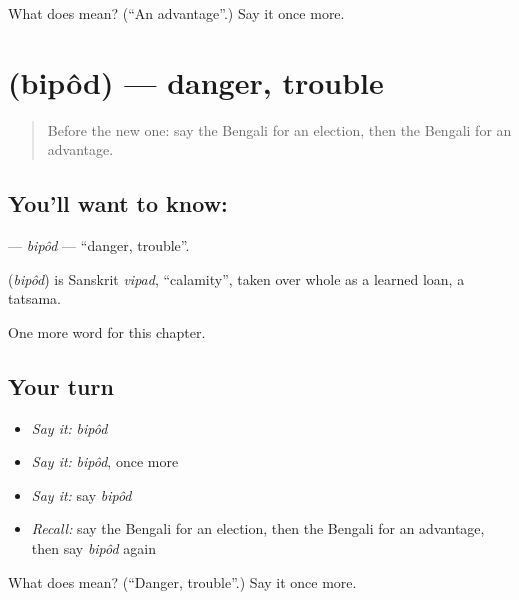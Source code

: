 \begin{tcolorbox}[breakable,colback=teal!4,colframe=teal!35!black,title={Before you move on}]
What does  mean? (\textquotedblleft{}An advantage\textquotedblright{}.) Say it once more.
\end{tcolorbox}
\section[\texorpdfstring{\bn{বিপদ} (bipôd)}{বিপদ (bipôd)}]{ (bipôd) — danger, trouble}

\label{lesson:BN-C254-bipod}



\begin{quote}
Before the new one: say the Bengali for an election, then the Bengali for an advantage.
\end{quote}

\subsection*{You'll want to know: }
\textbf{} — \emph{bipôd} — \textquotedblleft{}danger, trouble\textquotedblright{}.

\begin{cousinweb}
\textbf{} (\emph{bipôd}) is Sanskrit \emph{vipad}, \textquotedblleft{}calamity\textquotedblright{}, taken over whole as a learned loan, a tatsama.
\end{cousinweb}

\begin{grammarlens}[title={What you've built}]
One more word for this chapter.
\end{grammarlens}

\subsection*{Your turn}
\begin{itemize}
\raggedright
  \item \emph{Say it:} \emph{bipôd}
  \item \emph{Say it:} \emph{bipôd}, once more
  \item \emph{Say it:} say \emph{bipôd}
  \item \emph{Recall:} say the Bengali for an election, then the Bengali for an advantage, then say \emph{bipôd} again
\end{itemize}

\begin{tcolorbox}[breakable,colback=teal!4,colframe=teal!35!black,title={Before you move on}]
What does  mean? (\textquotedblleft{}Danger, trouble\textquotedblright{}.) Say it once more.
\end{tcolorbox}
